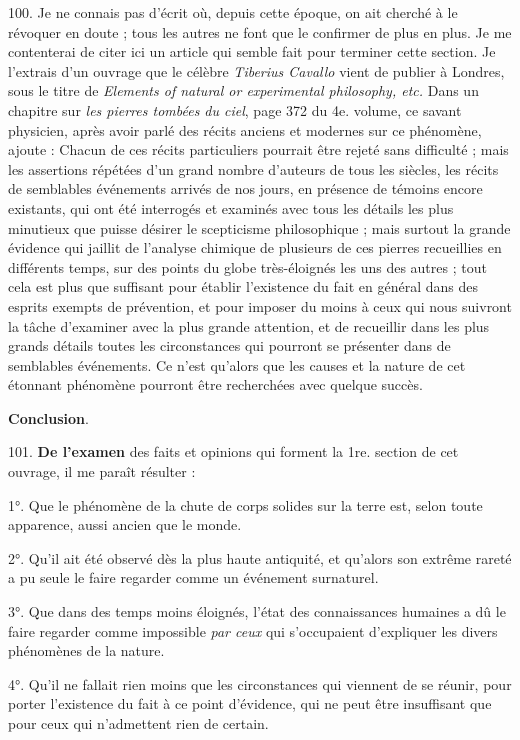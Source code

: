\documentclass[a4paper, 11pt, oneside, polutonikogreek, french]{article}
\begin{document}
100. Je ne connais pas d'écrit où, depuis cette époque, on ait cherché à le révoquer en doute ; tous les autres ne font que le confirmer de plus en plus. Je me contenterai de citer ici un article qui semble fait pour terminer cette section. Je l'extrais d'un ouvrage que le célèbre \emph{Tiberius Cavallo} vient de publier à Londres, sous le titre de \emph{Elements of natural or experimental philosophy, etc.} Dans un chapitre sur \emph{les pierres tombées du ciel}, page 372 du 4e. volume, ce savant physicien, après avoir parlé des récits anciens et modernes sur ce phénomène, ajoute : \og Chacun de ces récits particuliers pourrait être rejeté sans difficulté ; mais les assertions répétées d'un grand nombre d'auteurs de tous les siècles, les récits de semblables événements arrivés de nos jours, en présence de témoins encore existants, qui ont été interrogés et examinés avec tous les détails les plus minutieux que puisse désirer le scepticisme philosophique ; mais surtout la grande évidence qui jaillit de l'analyse chimique de plusieurs de ces pierres recueillies en différents temps, sur des points du globe très-éloignés les uns des autres ; tout cela est plus que suffisant pour établir l'existence du fait en général dans des esprits exempts de prévention, et pour imposer du moins à ceux qui nous suivront la tâche d'examiner avec la plus grande attention, et de recueillir dans les plus grands détails toutes les circonstances qui pourront se présenter dans de semblables événements. Ce n'est qu'alors que les causes et la nature de cet étonnant phénomène pourront être recherchées avec quelque succès. \fg

\begin{center}
\textbf{Conclusion}.
\end{center}

101. \textbf{De l'examen} des faits et opinions qui forment la 1re. section de cet ouvrage, il me paraît résulter :

1°. Que le phénomène de la chute de corps solides sur la terre est, selon toute apparence, aussi ancien que le monde.

2°. Qu'il ait été observé dès la plus haute antiquité, et qu'alors son extrême rareté a pu seule le faire regarder comme un événement surnaturel.

3°. Que dans des temps moins éloignés, l'état des connaissances humaines a dû le faire regarder comme impossible \emph{par ceux} qui s'occupaient d'expliquer les divers phénomènes de la nature.

4°. Qu'il ne fallait rien moins que les circonstances qui viennent de se réunir, pour porter l'existence du fait à ce point d'évidence, qui ne peut être insuffisant que pour ceux qui n'admettent rien de certain.
\end{document}
